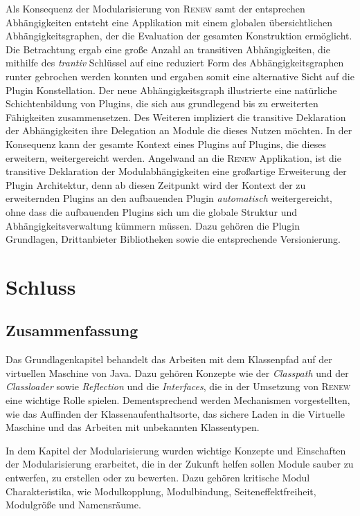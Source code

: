 Als Konsequenz der Modularisierung von \textsc{Renew} samt der entsprechen Abhängigkeiten entsteht eine Applikation mit einem globalen übersichtlichen Abhängigkeitsgraphen, der die Evaluation der gesamten Konstruktion ermöglicht. Die Betrachtung ergab eine große Anzahl an transitiven Abhängigkeiten, die mithilfe des \textit{trantiv} Schlüssel auf eine reduziert Form des Abhängigkeitsgraphen runter gebrochen werden konnten und ergaben somit eine alternative Sicht auf die Plugin Konstellation. Der neue Abhängigkeitsgraph illustrierte eine natürliche Schichtenbildung von Plugins, die sich aus grundlegend bis zu erweiterten Fähigkeiten zusammensetzen. Des Weiteren impliziert die transitive Deklaration der Abhängigkeiten ihre Delegation an Module die dieses Nutzen möchten. In der Konsequenz kann der gesamte Kontext eines Plugins auf Plugins, die dieses erweitern, weitergereicht werden. \newline
Angelwand an die \textsc{Renew} Applikation, ist die transitive Deklaration der Modulabhängigkeiten eine großartige Erweiterung der Plugin Architektur, denn ab diesen Zeitpunkt wird der Kontext der zu erweiternden Plugins an den aufbauenden Plugin \textit{automatisch} weitergereicht, ohne dass die aufbauenden Plugins sich um die globale Struktur und Abhängigkeitsverwaltung kümmern müssen. Dazu gehören die Plugin Grundlagen, Drittanbieter Bibliotheken sowie die entsprechende Versionierung. \newline



\chapter{Schluss}


\section{Zusammenfassung}

Das Grundlagenkapitel behandelt das Arbeiten mit dem Klassenpfad auf der virtuellen Maschine von Java. Dazu gehören Konzepte wie der \textit{Classpath} und der \textit{Classloader} sowie \textit{Reflection} und die \textit{Interfaces}, die in der Umsetzung von \textsc{Renew} eine wichtige Rolle spielen. Dementsprechend werden Mechanismen vorgestellten, wie das Auffinden der Klassenaufenthaltsorte, das sichere Laden in die Virtuelle Maschine und das Arbeiten mit unbekannten Klassentypen.\bigbreak

In dem Kapitel der Modularisierung wurden wichtige Konzepte und Einschaften der Modularisierung erarbeitet, die in der Zukunft helfen sollen Module sauber zu entwerfen, zu erstellen oder zu bewerten. Dazu gehören kritische Modul Charakteristika, wie Modulkopplung, Modulbindung, Seiteneﬀektfreiheit, Modulgröße und Namensräume. \bigbreak

